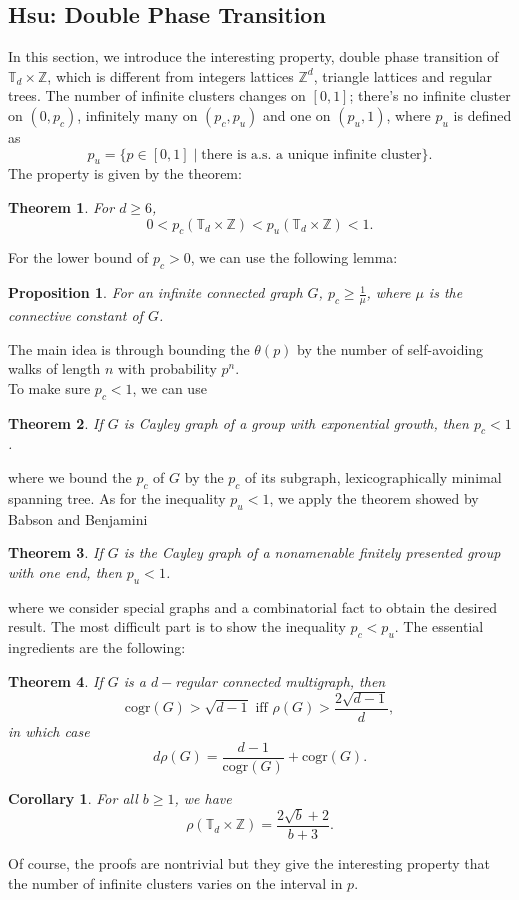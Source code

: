 \documentclass[12pt]{article}
\theoremstyle{plane}
\newtheorem*{thm}{Theorem}
\newtheorem*{cor}{Corollary}
\newtheorem*{prop}{Proposition}
\theoremstyle{definition}
\begin{document}
\subsection*{Hsu: Double Phase Transition}
In this section, we introduce the interesting property, double phase transition of $\mathbb{T}_d\times\mathbb{Z}$, which is different from integers lattices $\mathbb{Z}^d$, triangle lattices and regular trees. The number of infinite clusters changes on $[0,1]$; there's no infinite cluster on $(0,p_c)$, infinitely many on $(p_c,p_u)$ and one on $(p_u,1)$, where $p_u$ is defined as \[p_u=\{p\in [0,1] \mid \text{there is a.s. a unique infinite cluster}\}.\]
The property is given by the theorem:
\begin{thm}
For $d\geq 6$, \[0<p_c(\mathbb{T}_d\times\mathbb{Z})<p_u(\mathbb{T}_d\times\mathbb{Z})<1.\]
\end{thm}
For the lower bound of $p_c>0$, we can use the following lemma:
\begin{prop}
For an infinite connected graph $G$, $p_c\geq\frac{1}{\mu}$, where $\mu$ is the connective constant of $G$.
\end{prop}
The main idea is through bounding the $\theta(p)$ by the number of self-avoiding walks of length $n$ with probability $p^n$.\\To make sure $p_c<1$, 
we can use 
\begin{thm}
If $G$ is Cayley graph of a group with exponential growth, then $p_c<1$.
\end{thm}
where we bound the $p_c$ of $G$ by the $p_c$ of its subgraph, lexicographically minimal spanning tree. As for the inequality $p_u<1$, we apply the theorem showed by Babson and Benjamini
\begin{thm}
If $G$ is the Cayley graph of a nonamenable finitely presented group with one end, then $p_u<1$.
\end{thm}
where we consider special graphs and a combinatorial fact to obtain the desired result. The most difficult part is to show the inequality $p_c<p_u$. The essential ingredients are the following:
\begin{thm}
If $G$ is a $d-$regular connected multigraph, then \[\text{cogr}(G)>\sqrt{d-1} \text{ iff } \rho(G)>\frac{2\sqrt{d-1}}{d},\] in which case \[d\rho(G)=\frac{d-1}{\text{cogr}(G)}+\text{cogr}(G).\]
\end{thm}
\begin{cor}
For all $b\geq 1$, we have \[\rho(\mathbb{T}_d\times\mathbb{Z})=\frac{2\sqrt{b}+2}{b+3}.\]
\end{cor}
Of course, the proofs are nontrivial but they give the interesting property that the number of infinite clusters varies on the interval in $p$. \\
\bigskip\\
\end{document}
